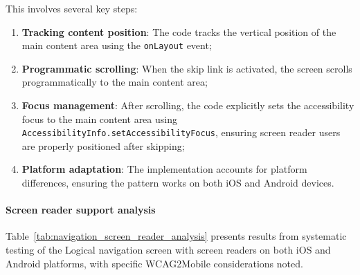 This involves several key steps:

\begin{enumerate}
    \item \textbf{Tracking content position}: The code tracks the vertical position of the main content area using the \texttt{onLayout} event;
    
    \item \textbf{Programmatic scrolling}: When the skip link is activated, the screen scrolls programmatically to the main content area;
    
    \item \textbf{Focus management}: After scrolling, the code explicitly sets the accessibility focus to the main content area using \texttt{AccessibilityInfo.setAccessibilityFocus}, ensuring screen reader users are properly positioned after skipping;
    
    \item \textbf{Platform adaptation}: The implementation accounts for platform differences, ensuring the pattern works on both iOS and Android devices.
\end{enumerate}

\paragraph{Screen reader support analysis}

Table~\ref{tab:navigation_screen_reader_analysis} presents results from systematic testing of the Logical navigation screen with screen readers on both iOS and Android platforms, with specific WCAG2Mobile considerations noted.

